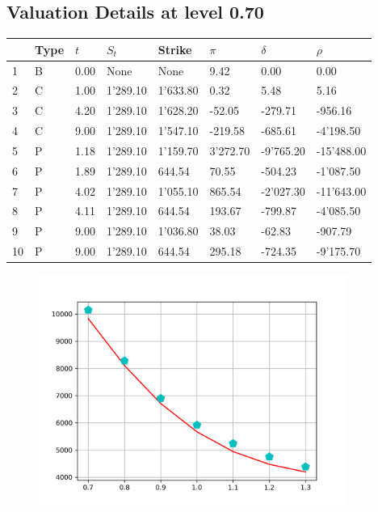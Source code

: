 \documentclass[12pt]{article}
\begin{document}
\begin{center} 
 \subsection{Valuation Details at level 0.70} 
 \par 
 \begin{scriptsize} 
 \begin{tabular}{p{13.1 mm}|p{13.1 mm}|p{13.1 mm}|p{13.1 mm}|p{13.1 mm}|p{13.1 mm}|p{13.1 mm}|p{13.1 mm}} 
          &     Type &      $t$ &    $S_t$ &   Strike &    $\pi$ & $\delta$ &   $\rho$ \\ \hline 
1 & B& 0.00& None& None& 9.42& 0.00& 0.00\\ 
2 & C& 1.00& 1'289.10& 1'633.80& 0.32& 5.48& 5.16\\ 
3 & C& 4.20& 1'289.10& 1'628.20& -52.05& -279.71& -956.16\\ 
4 & C& 9.00& 1'289.10& 1'547.10& -219.58& -685.61& -4'198.50\\ 
5 & P& 1.18& 1'289.10& 1'159.70& 3'272.70& -9'765.20& -15'488.00\\ 
6 & P& 1.89& 1'289.10& 644.54& 70.55& -504.23& -1'087.50\\ 
7 & P& 4.02& 1'289.10& 1'055.10& 865.54& -2'027.30& -11'643.00\\ 
8 & P& 4.11& 1'289.10& 644.54& 193.67& -799.87& -4'085.50\\ 
9 & P& 9.00& 1'289.10& 1'036.80& 38.03& -62.83& -907.79\\ 
10 & P& 9.00& 1'289.10& 644.54& 295.18& -724.35& -9'175.70\\ 
\end{tabular} 
  \end{scriptsize} 
 \end{center}\begin{figure} 
\includegraphics[width=0.9\textwidth]{task40.png} 

\end{figure}
\end{document}
